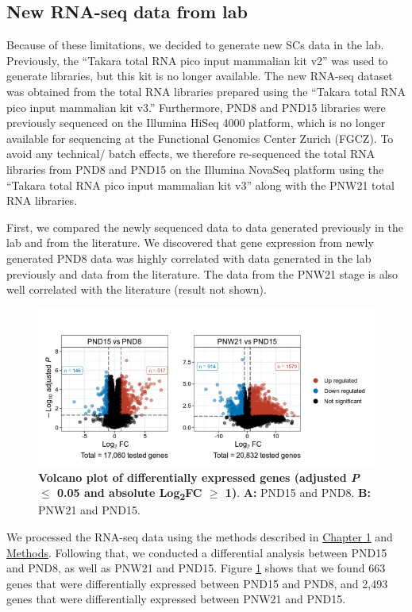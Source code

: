 \documentclass[12pt,twoside]{reedthesis}
\begin{document}
\hypertarget{new-rna-seq-data-from-lab}{%
\subsection{New RNA-seq data from lab}\label{new-rna-seq-data-from-lab}}

Because of these limitations, we decided to generate new SCs data in the
lab. Previously, the ``Takara total RNA pico input mammalian kit v2'' was
used to generate libraries, but this kit is no longer available. The new
RNA-seq dataset was obtained from the total RNA libraries prepared using
the ``Takara total RNA pico input mammalian kit v3.'' Furthermore, PND8
and PND15 libraries were previously sequenced on the Illumina HiSeq 4000
platform, which is no longer available for sequencing at the Functional
Genomics Center Zurich (FGCZ). To avoid any technical/ batch effects, we
therefore re-sequenced the total RNA libraries from PND8 and PND15 on
the Illumina NovaSeq platform using the ``Takara total RNA pico input
mammalian kit v3'' along with the PNW21 total RNA libraries.

First, we compared the newly sequenced data to data generated previously
in the lab and from the literature. We discovered that gene expression
from newly generated PND8 data was highly correlated with data generated
in the lab previously and data from the literature. The data from the
PNW21 stage is also well correlated with the literature (result not
shown).



\begin{figure}[htbp]

{\centering \includegraphics{thesis_files/figure-latex/dn2-1} 

}

\caption[Volcano plot of differentially expressed genes]{\textbf{Volcano plot of differentially expressed genes (adjusted \textit{P} $\leq$ 0.05 and absolute Log\textsubscript{2}FC $\geq$ 1)}.\newline
\textbf{A:} PND15 and PND8. \newline \textbf{B:} PNW21 and PND15.}\label{fig:dn2}
\end{figure}
We processed the RNA-seq data using the methods described in \protect\hyperlink{chapter1}{Chapter
1}
and \protect\hyperlink{methods}{Methods}. Following that, we conducted a differential analysis
between PND15 and PND8, as well as PNW21 and PND15. Figure \ref{fig:dn2} shows that
we found 663 genes that were differentially expressed between PND15 and
PND8, and 2,493 genes that were differentially expressed between PNW21
and PND15.
\end{document}
